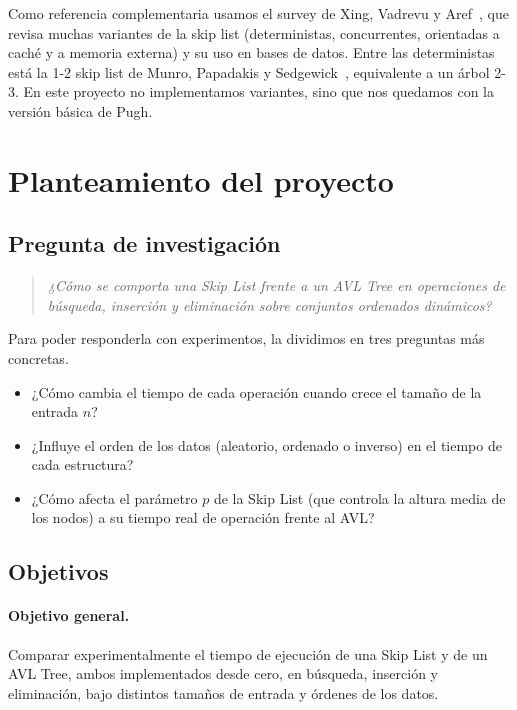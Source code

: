 \documentclass[11pt,a4paper]{article}
\begin{document}
Como referencia complementaria usamos el survey de Xing, Vadrevu y
Aref~\cite{vadrevu2024}, que revisa muchas variantes de la skip list
(deterministas, concurrentes, orientadas a caché y a memoria externa) y su uso
en bases de datos. Entre las deterministas está la 1-2 skip list de Munro,
Papadakis y Sedgewick~\cite{munro1992}, equivalente a un árbol 2-3. En este
proyecto no implementamos variantes, sino que nos quedamos con la versión
básica de Pugh.

\section{Planteamiento del proyecto}\label{sec:plan}

\subsection{Pregunta de investigación}

\begin{quote}
\itshape
¿Cómo se comporta una Skip List frente a un AVL Tree en operaciones de
búsqueda, inserción y eliminación sobre conjuntos ordenados dinámicos?
\end{quote}

Para poder responderla con experimentos, la dividimos en tres preguntas más
concretas.
\begin{itemize}
  \item[\textbf{P1.}] ¿Cómo cambia el tiempo de cada operación cuando crece el
  tamaño de la entrada $n$?
  \item[\textbf{P2.}] ¿Influye el orden de los datos (aleatorio, ordenado o
  inverso) en el tiempo de cada estructura?
  \item[\textbf{P3.}] ¿Cómo afecta el parámetro $p$ de la Skip List (que
  controla la altura media de los nodos) a su tiempo real de operación frente
  al AVL?
\end{itemize}

\subsection{Objetivos}

\paragraph{Objetivo general.}
Comparar experimentalmente el tiempo de ejecución de una Skip List y de un AVL
Tree, ambos implementados desde cero, en búsqueda, inserción y eliminación,
bajo distintos tamaños de entrada y órdenes de los datos.
\end{document}
